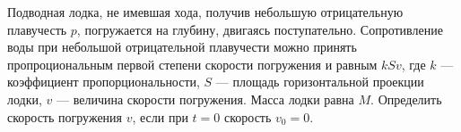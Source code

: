 Подводная лодка, не имевшая хода, получив небольшую отрицательную
плавучесть $p$, погружается на глубину, двигаясь поступательно.
Сопротивление воды при небольшой отрицательной плавучести можно
принять пропроциональным первой степени скорости погружения и равным
$kSv$, где $k$ --- коэффициент пропорциональности, $S$ --- площадь
горизонтальной проекции лодки, $v$ --- величина скорости погружения.
Масса лодки равна $M$. Определить скорость погружения $v$, если при
$t=0$ скорость $v_{0}=0$.
